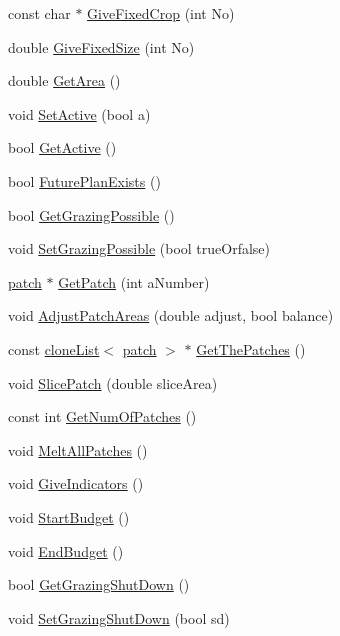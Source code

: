 \begin{DoxyCompactItemize}
const char $\ast$ \hyperlink{classfield_aa6414fb1ce4976eb0b4693572c545352}{GiveFixedCrop} (int No)
\item 
double \hyperlink{classfield_ad7e63b07d4199618d6e0cdfd16619b95}{GiveFixedSize} (int No)
\item 
double \hyperlink{classfield_ac4c5edc4de9c9035c58c7204356a12b0}{GetArea} ()
\item 
void \hyperlink{classfield_a1e6214765a7a3851aaa23c54e5270b8b}{SetActive} (bool a)
\item 
bool \hyperlink{classfield_a80a51fb0402683c89f7aa316210854e1}{GetActive} ()
\item 
bool \hyperlink{classfield_a266182a9e7fd4a4707e1e81c9ab23abe}{FuturePlanExists} ()
\item 
bool \hyperlink{classfield_aadde0ba8d453394c5e790f7e92c0cb35}{GetGrazingPossible} ()
\item 
void \hyperlink{classfield_a68b457aa1077de7fca8e8230d69c2ed0}{SetGrazingPossible} (bool trueOrfalse)
\item 
\hyperlink{classpatch}{patch} $\ast$ \hyperlink{classfield_a1c1d7b0d34468d382915e228f29d13ea}{GetPatch} (int aNumber)
\item 
void \hyperlink{classfield_a7e446412f0c24c7a58401dab58c10a40}{AdjustPatchAreas} (double adjust, bool balance)
\item 
const \hyperlink{classclone_list}{cloneList}$<$ \hyperlink{classpatch}{patch} $>$ $\ast$ \hyperlink{classfield_abd533cd184e5e45a7bc1718f46962520}{GetThePatches} ()
\item 
void \hyperlink{classfield_a66e90b94decea0ecf62aa77d7ffe842a}{SlicePatch} (double sliceArea)
\item 
const int \hyperlink{classfield_aebe4396575cb69945b1aa60e4837f48c}{GetNumOfPatches} ()
\item 
void \hyperlink{classfield_aa848ac8ed702a8c82aea5263bb65e451}{MeltAllPatches} ()
\item 
void \hyperlink{classfield_a5e7c7c8374cf01bc46d7e0c4619b5bd5}{GiveIndicators} ()
\item 
void \hyperlink{classfield_a3ee84f37d88779277b69e962346b1a24}{StartBudget} ()
\item 
void \hyperlink{classfield_a16113f10f06008c8c9c9e117b568b98f}{EndBudget} ()
\item 
bool \hyperlink{classfield_aaa75ae81d0511e47197059ee64b38dc5}{GetGrazingShutDown} ()
\item 
void \hyperlink{classfield_a72edee119271bbed91109a3c648c61c6}{SetGrazingShutDown} (bool sd)

\end{DoxyCompactItemize}
